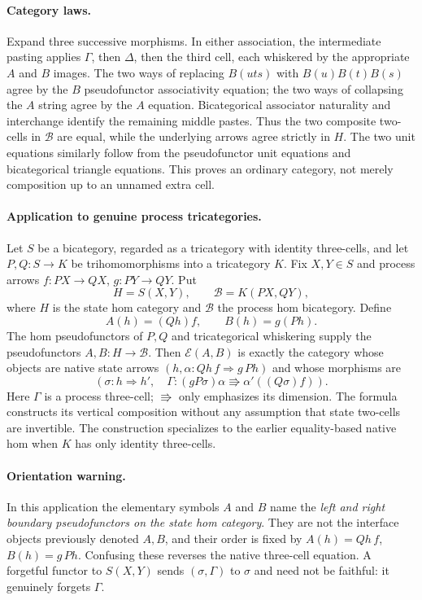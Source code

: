 \documentclass{article}
\begin{document}
\paragraph{Category laws.} Expand three successive morphisms. In either association, the intermediate pasting applies $\Gamma$, then $\Delta$, then the third cell, each whiskered by the appropriate $A$ and $B$ images. The two ways of replacing $B(uts)$ with $B(u)B(t)B(s)$ agree by the $B$ pseudofunctor associativity equation; the two ways of collapsing the $A$ string agree by the $A$ equation. Bicategorical associator naturality and interchange identify the remaining middle pastes. Thus the two composite two-cells in $\mathcal B$ are equal, while the underlying arrows agree strictly in $H$. The two unit equations similarly follow from the pseudofunctor unit equations and bicategorical triangle equations. This proves an ordinary category, not merely composition up to an unnamed extra cell.

\paragraph{Application to genuine process tricategories.} Let $S$ be a bicategory, regarded as a tricategory with identity three-cells, and let $P,Q:S\to K$ be trihomomorphisms into a tricategory $K$. Fix $X,Y\in S$ and process arrows $f:PX\to QX$, $g:PY\to QY$. Put
\[
 H=S(X,Y),\qquad \mathcal B=K(PX,QY),
\]
where $H$ is the state hom category and $\mathcal B$ the process hom bicategory. Define
\[
 A(h)=(Qh)f,\qquad B(h)=g(Ph).
\]
The hom pseudofunctors of $P,Q$ and tricategorical whiskering supply the pseudofunctors $A,B:H\to\mathcal B$. Then $\mathcal E(A,B)$ is exactly the category whose objects are native state arrows $(h,\alpha:Qh\,f\Rightarrow g\,Ph)$ and whose morphisms are
\[
 (\sigma:h\Rightarrow h',\quad
 \Gamma:(gP\sigma)\alpha\Rrightarrow\alpha'((Q\sigma)f)).
\]
Here $\Gamma$ is a process three-cell; $\Rrightarrow$ only emphasizes its dimension. The formula constructs its vertical composition without any assumption that state two-cells are invertible. The construction specializes to the earlier equality-based native hom when $K$ has only identity three-cells.

\paragraph{Orientation warning.} In this application the elementary symbols $A$ and $B$ name the \emph{left and right boundary pseudofunctors on the state hom category}. They are not the interface objects previously denoted $A,B$, and their order is fixed by $A(h)=Qh\,f$, $B(h)=g\,Ph$. Confusing these reverses the native three-cell equation. A forgetful functor to $S(X,Y)$ sends $(\sigma,\Gamma)$ to $\sigma$ and need not be faithful: it genuinely forgets $\Gamma$.
\end{document}
